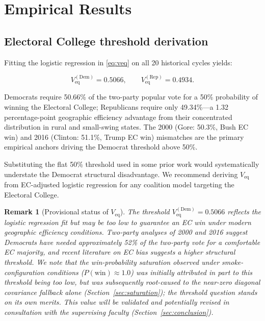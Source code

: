 \documentclass[12pt, letterpaper]{article}
\newtheorem{remark}{Remark}
\theoremstyle{definition}
\newcommand{\Veq}{V_{\mathrm{eq}}}
\begin{document}
\section{Empirical Results}
\label{sec:results}

\subsection{Electoral College threshold derivation}
\label{sec:veq_results}

Fitting the logistic regression in \eqref{eq:veq} on all 20 historical cycles
yields:

\begin{equation}
  \Veq^{(\text{Dem})} = 0.5066, \qquad
  \Veq^{(\text{Rep})} = 0.4934.
  \label{eq:veq_result}
\end{equation}

Democrats require 50.66\% of the two-party popular vote for a 50\% probability
of winning the Electoral College; Republicans require only 49.34\%---a 1.32
percentage-point geographic efficiency advantage from their concentrated
distribution in rural and small-swing states. The 2000 (Gore: 50.3\%,
Bush EC win) and 2016 (Clinton: 51.1\%, Trump EC win) mismatches are the
primary empirical anchors driving the Democrat threshold above 50\%.

Substituting the flat 50\% threshold used in some prior work would systematically
understate the Democrat structural disadvantage. We recommend deriving $\Veq$
from EC-adjusted logistic regression for any coalition model targeting the
Electoral College.

\begin{remark}[Provisional status of $\Veq$]
The threshold $\Veq^{(\text{Dem})} = 0.5066$ reflects the logistic regression
fit but may be too low to guarantee an EC win under modern geographic efficiency
conditions. Two-party analyses of 2000 and 2016 suggest Democrats have needed
approximately 52\% of the two-party vote for a comfortable EC majority, and
recent literature on EC bias \citep[see, e.g.,][]{Linzer2013} suggests a higher
structural threshold. We note that the win-probability saturation observed under
smoke-configuration conditions ($P(\text{win}) \approx 1.0$) was initially
attributed in part to this threshold being too low, but was subsequently
root-caused to the near-zero diagonal covariance fallback alone
(Section~\ref{sec:saturation}); the threshold question stands on its own merits.
This value will be validated and potentially revised in consultation with the
supervising faculty (Section~\ref{sec:conclusion}).
\end{remark}
\end{document}
